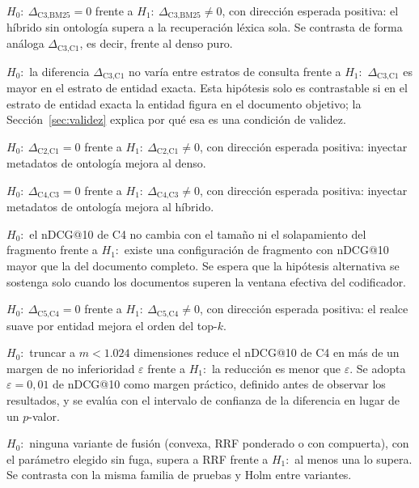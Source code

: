 \documentclass[11pt,letterpaper]{article}
\numberwithin{equation}{section}
\begin{document}
\begin{description}[leftmargin=2.6em,style=nextline,itemsep=3pt]
  \item[\textbf{H1} (P1).] $H_0\!:\ \Delta_{\text{C3},\text{BM25}}=0$ \quad frente a \quad $H_1\!:\ \Delta_{\text{C3},\text{BM25}}\neq 0$, con dirección esperada positiva: el híbrido sin ontología supera a la recuperación léxica sola. Se contrasta de forma análoga $\Delta_{\text{C3},\text{C1}}$, es decir, frente al denso puro.

  \item[\textbf{H2} (P2).] $H_0\!:$ la diferencia $\Delta_{\text{C3},\text{C1}}$ no varía entre estratos de consulta \quad frente a \quad $H_1\!:$ $\Delta_{\text{C3},\text{C1}}$ es mayor en el estrato de entidad exacta. Esta hipótesis solo es contrastable si en el estrato de entidad exacta la entidad figura en el documento objetivo; la Sección~\ref{sec:validez} explica por qué esa es una condición de validez.

  \item[\textbf{H3a} (P3, denso).] $H_0\!:\ \Delta_{\text{C2},\text{C1}}=0$ \quad frente a \quad $H_1\!:\ \Delta_{\text{C2},\text{C1}}\neq 0$, con dirección esperada positiva: inyectar metadatos de ontología mejora al denso.

  \item[\textbf{H3b} (P3, híbrido).] $H_0\!:\ \Delta_{\text{C4},\text{C3}}=0$ \quad frente a \quad $H_1\!:\ \Delta_{\text{C4},\text{C3}}\neq 0$, con dirección esperada positiva: inyectar metadatos de ontología mejora al híbrido.

  \item[\textbf{H4} (P4).] $H_0\!:$ el nDCG@10 de C4 no cambia con el tamaño ni el solapamiento del fragmento \quad frente a \quad $H_1\!:$ existe una configuración de fragmento con nDCG@10 mayor que la del documento completo. Se espera que la hipótesis alternativa se sostenga solo cuando los documentos superen la ventana efectiva del codificador.

  \item[\textbf{H5} (P5).] $H_0\!:\ \Delta_{\text{C5},\text{C4}}=0$ \quad frente a \quad $H_1\!:\ \Delta_{\text{C5},\text{C4}}\neq 0$, con dirección esperada positiva: el realce suave por entidad mejora el orden del top-$k$.

  \item[\textbf{H6} (P6).] $H_0\!:$ truncar a $m<1.024$ dimensiones reduce el nDCG@10 de C4 en más de un margen de no inferioridad $\varepsilon$ \quad frente a \quad $H_1\!:$ la reducción es menor que $\varepsilon$. Se adopta $\varepsilon=0{,}01$ de nDCG@10 como margen práctico, definido antes de observar los resultados, y se evalúa con el intervalo de confianza de la diferencia en lugar de un $p$-valor.
  \item[\textbf{H7} (exploratoria).] $H_0\!:$ ninguna variante de fusión (convexa, RRF ponderado o con compuerta), con el parámetro elegido sin fuga, supera a RRF \quad frente a \quad $H_1\!:$ al menos una lo supera. Se contrasta con la misma familia de pruebas y Holm entre variantes.
\end{description}
\end{document}
